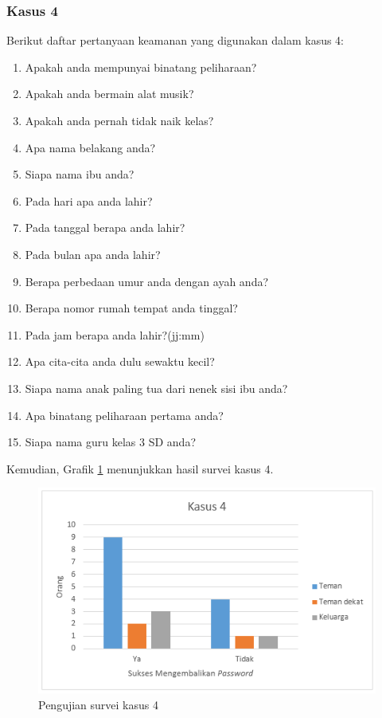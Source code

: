 \subsubsection{Kasus 4}

Berikut daftar pertanyaan keamanan yang digunakan dalam kasus 4:

\begin{enumerate}[itemsep=0mm]
	\item Apakah anda mempunyai binatang peliharaan?
	\item Apakah anda bermain alat musik?
	\item Apakah anda pernah tidak naik kelas?
	\item Apa nama belakang anda?
	\item Siapa nama ibu anda?
	\item Pada hari apa anda lahir?
	\item Pada tanggal berapa anda lahir?
	\item Pada bulan apa anda lahir?
	\item Berapa perbedaan umur anda dengan ayah anda?
	\item Berapa nomor rumah tempat anda tinggal?
	\item Pada jam berapa anda lahir?(jj:mm)
	\item Apa cita-cita anda dulu sewaktu kecil?
	\item Siapa nama anak paling tua dari nenek sisi ibu anda?
	\item Apa binatang peliharaan pertama anda?
	\item Siapa nama guru kelas 3 SD anda?
\end{enumerate}

Kemudian, Grafik \ref{fig:kasus4} menunjukkan hasil survei kasus 4.

\begin{figure}[H]
	\includegraphics[scale=0.8]{Gambar/kasus4}
	\centering
	\caption{Pengujian survei kasus 4}\label{fig:kasus4}
\end{figure}

